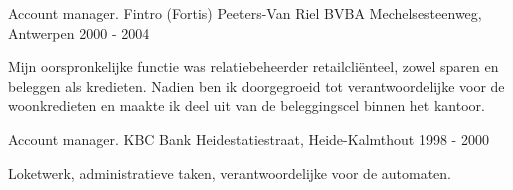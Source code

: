 \begin{cventries}

\cventry
{Account manager.} %
{Fintro (Fortis) Peeters-Van Riel BVBA} %
{Mechelsesteenweg, Antwerpen} %
{2000 - 2004} %
{ %
\begin{cvitems}
\item {Mĳn oorspronkelĳke functie was relatiebeheerder retailcliënteel, zowel sparen en beleggen
	als kredieten. Nadien ben ik doorgegroeid tot verantwoordelĳke voor de woonkredieten en maakte
	ik deel uit van de beleggingscel binnen het kantoor.}
\end{cvitems} 
}




\cventry
{Account manager.} %
{KBC Bank} %
{Heidestatiestraat, Heide-Kalmthout} %
{1998 - 2000} %
{ %
	\begin{cvitems}
		\item { Loketwerk, administratieve taken, verantwoordelĳke voor de automaten.}
	\end{cvitems} 
}



\end{cventries}